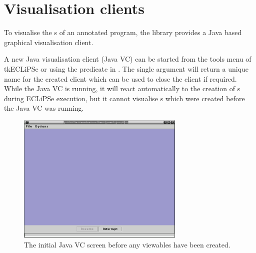 %
% 
% 
% 
% 

\chapter{Visualisation clients}
\label{sec:visu-clients}

To visualise the \viewable{}s of an annotated program, the library
 provides a Java
based graphical visualisation client.

A new Java visualisation client (Java VC) can be started from the
tools menu of tkECLiPSe or using the predicate \startvcone{} in
. The single
argument will return a unique name for the created client which can be
used to close the client if required.  While the Java VC is running,
it will react automatically to the creation of \viewable{}s during
ECLiPSe execution, but it cannot visualise \viewable{}s which were
created before the Java VC was running.

\begin{figure}[htp]
\centering
\includegraphics[width=8cm]{vcstartup}
\caption{The initial Java VC screen before any viewables have been created.}
\label{fig:startup}
\end{figure}


